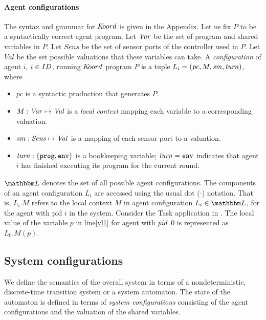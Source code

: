 \paragraph{Agent configurations}
The  syntax and grammar for $K\kern-2pt oord$ is given in the Appendix. 
Let us fix $P$ to be a syntactically correct agent program. Let $\mathit{Var}$ be the set of program and shared variables in $P$. Let $\mathit{Sens}$ be the set of sensor ports of the controller used in $P$. Let $\mathit{Val}$ be the set possible valuations that these variables can take. 
A {\em configuration\/} of agent $\mathit{i}$, $i \in ID$, running $K\kern-2pt oord$ program $P$ is a tuple $ L_i = (\mathit{pc}, {M},\mathit{sm},\mathit{turn})$, where
\begin{itemize}
 \item $\mathit{pc}$ is a syntactic production that generates $P$. 
\item ${M} : \mathit{Var} \mapsto \mathit{Val}$ is a {\em local context\/} mapping each variable to a corresponding valuation.
 \item $\mathit{sm} : \mathit{Sens} \mapsto \mathit{Val}$ is a mapping of each sensor port to a valuation.
 \item $\mathit{turn}:\{\mathtt{prog,env}\}$ is a bookkeeping variable; $\mathit{turn} = \mathtt{env}$ indicates that agent $i$ has finished executing its program for the current round.  
\end{itemize}
$\pwl$ denotes  the set of all possible agent configurations. The components of an agent configuration $L_i$ are accessed using the usual dot ($\cdot$) notation. That is, $L_i.M$ refers to the local context $M$ in agent configuration $L_i \in \pwl$, for the agent with pid $i$ in the system.  
%
%
Consider the Task application in . The local value of the variable $p$ in line\ref{vl1} for agent with $\mathit{pid}$ 0 is represented as $L_0.M(p)$. 



\subsection{System configurations}

We define the semantics of the overall system in terms of a nondeterministic, discrete-time transition system or a system automaton. The state of the automaton is defined in terms of {\em system configurations\/} consisting of the agent configurations and the valuation of the shared variables. 

